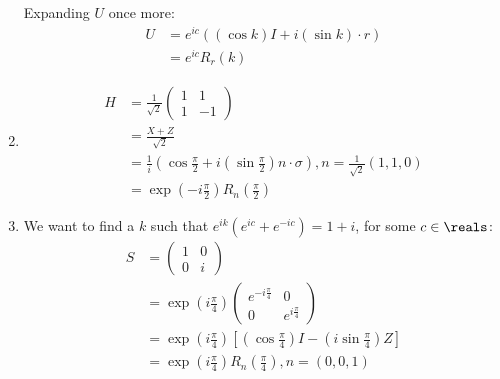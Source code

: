 \begin{enumerate}
%
Expanding $U$ once more:
%
\begin{align}
U &= e^{ic} \left( \left( \cos k \right) I + i \left( \sin k \right) \cdot r \right) \\
&= e^{ic} R_r \left( k \right)
\end{align}
%
\item \begin{align}
H &= \frac{1}{\sqrt{2}} \begin{pmatrix} 1 & 1 \\ 1 & -1 \end{pmatrix} \\
&= \frac{X + Z}{\sqrt{2}} \\
&= \frac1i \left( \cos \frac{\pi}{2} + i \left( \sin \frac{\pi}{2} \right)  n \cdot \sigma \right), n = \frac{1}{\sqrt{2}} \left( 1, 1, 0 \right) \\
&= \exp \left( -i \frac{\pi}{2} \right) R_n \left( \frac{\pi}{2} \right)
\end{align}
%
\item We want to find a $k$ such that $e^{ik} \left( e^{ic} + e^{-ic} \right) = 1 + i$, for some $c \in \reals$:
%
\begin{align}
S &= \begin{pmatrix} 1 & 0 \\ 0 & i \end{pmatrix} \\
&= \exp \left( i \frac{\pi}{4} \right) \begin{pmatrix} e^{-i \frac{\pi}{4}} & 0 \\ 0 & e^{i \frac{\pi}{4}} \end{pmatrix} \\
&= \exp \left( i \frac{\pi}{4} \right) \left[ \left( \cos \frac{\pi}{4} \right) I - \left(i \sin \frac{\pi}{4} \right) Z \right] \\
&= \exp \left( i \frac{\pi}{4} \right) R_n \left( \frac{\pi}{4} \right), n = \left(0, 0, 1 \right)
\end{align}
\end{enumerate}
\endgroup
